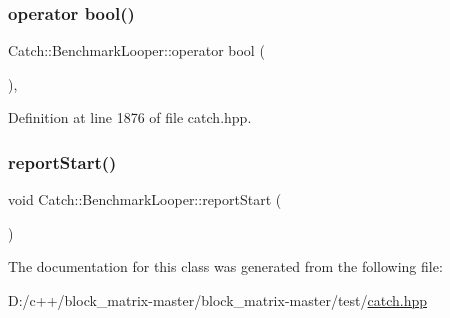 \mbox{\label{class_catch_1_1_benchmark_looper_a54da41bada9da038dc05faf41d746765}} 
\subsubsection{\texorpdfstring{operator bool()}{operator bool()}}
{\footnotesize\ttfamily Catch\+::\+Benchmark\+Looper\+::operator bool (\begin{DoxyParamCaption}{ }\end{DoxyParamCaption})\hspace{0.3cm}{\ttfamily [inline]}, {\ttfamily [explicit]}}



Definition at line 1876 of file catch.\+hpp.

\mbox{\label{class_catch_1_1_benchmark_looper_a0697d1b266112b110edf2025b82c4e77}} 
\subsubsection{\texorpdfstring{report\+Start()}{reportStart()}}
{\footnotesize\ttfamily void Catch\+::\+Benchmark\+Looper\+::report\+Start (\begin{DoxyParamCaption}{ }\end{DoxyParamCaption})}



The documentation for this class was generated from the following file\+:\begin{DoxyCompactItemize}
\item 
D\+:/c++/block\+\_\+matrix-\/master/block\+\_\+matrix-\/master/test/\mbox{\hyperlink{catch_8hpp}{catch.\+hpp}}\end{DoxyCompactItemize}
